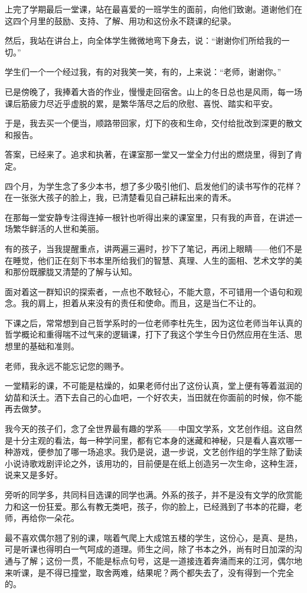 \par 上完了学期最后一堂课，站在最喜爱的一班学生的面前，向他们致谢。道谢他们在这四个月里的鼓励、支持、了解、用功和这份永不跷课的纪录。
\par 然后，我站在讲台上，向全体学生微微地弯下身去，说：“谢谢你们所给我的一切。”
\par 学生们一个一个经过我，有的对我笑一笑，有的，上来说：“老师，谢谢你。”
\par 已是傍晚了，我捧着大沓的作业，慢慢走回宿舍。山上的冬日总也是风雨，每一场课后筋疲力尽近乎虚脱的累，是繁华落尽之后的欣慰、喜悦、踏实和平安。
\par 于是，我去买一个便当，顺路带回家，灯下的夜和生命，交付给批改到深更的散文和报告。
\par 答案，已经来了。追求和执著，在课室那一堂又一堂全力付出的燃烧里，得到了肯定。
\par 四个月，为学生念了多少本书，想了多少吸引他们、启发他们的读书写作的花样？在一张张大孩子的脸上，我，已清楚看见自己耕耘出来的青禾。
\par 在那每一堂安静专注得连掉一根针也听得出来的课室里，只有我的声音，在讲述一场繁华鲜活的人世和美丽。
\par 有的孩子，当我提醒重点，讲两遍三遍时，抄下了笔记，再闭上眼睛——他们不是在睡觉，他们正在刻下书本里所给我们的智慧、真理、人生的面相、艺术文学的美和那份既朦胧又清楚的了解与认知。
\par 面对着这一群知识的探索者，一点也不敢轻心，不能大意，不可错用一个语句和观念。我的肩上，担着从来没有的责任和使命。而且，这是当仁不让的。
\par 下课之后，常常想到自己哲学系时的一位老师李杜先生，因为这位老师当年认真的哲学概论和重得喘不过气来的逻辑课，打下了我这个学生今日仍然应用在生活、思想里的基础和准则。
\par 老师，我永远不能忘记您的赐予。
\par 一堂精彩的课，不可能是枯燥的，如果老师付出了这份认真，堂上便有等着滋润的幼苗和沃土。洒下去自己的心血吧，一个好农夫，当田就在你面前的时候，你不能再去做梦。
\par 我今天的孩子们，念了全世界最有趣的学系——中国文学系，文艺创作组。这自然是十分主观的看法，每一种学问里，都有它本身的迷藏和神秘，只是看人喜欢哪一种游戏，便参加了哪一场追求。我仍是说，退一步说，文艺创作组的学生除了勤读小说诗歌戏剧评论之外，该用功的，目前便是在纸上创造另一次生命，这种生涯，说来又是多好。
\par 旁听的同学多，共同科目选课的同学也满。外系的孩子，并不是没有文学的欣赏能力和这一份狂爱。那么有教无类吧，孩子，你的脸上，已经溅到了书本的花瓣，老师，再给你一朵花。
\par 最不喜欢偶尔翘了别的课，喘着气爬上大成馆五楼的学生，这份心，是真、是热，可是听课也得明白一气呵成的道理。师生之间，除了书本之外，尚有时日加深的沟通与了解；这份一贯，不能是标点句号，这是一道接连着奔涌而来的江河，偶尔地来听课，是不得已撞堂，取舍两难，结果呢？两个都失去了，没有得到一个完全的。
